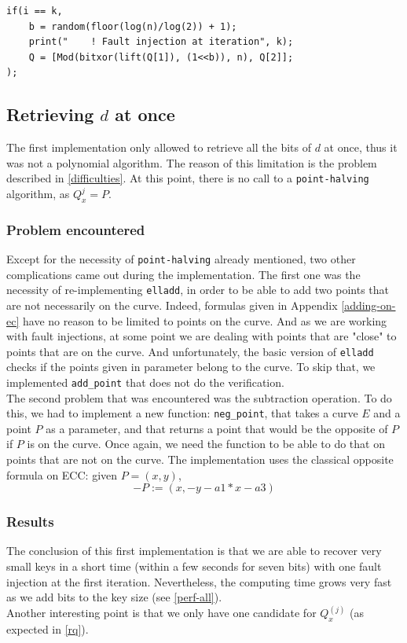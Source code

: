 \documentclass[journal]{IEEEtran}
\begin{document}
\begin{footnotesize}
\begin{verbatim}
if(i == k,
    b = random(floor(log(n)/log(2)) + 1);
    print("    ! Fault injection at iteration", k);
    Q = [Mod(bitxor(lift(Q[1]), (1<<b)), n), Q[2]];
);
\end{verbatim}
\end{footnotesize}

\subsection{Retrieving $d$ at once}
The first implementation only allowed to retrieve all the bits of $d$ at once, thus it was not a polynomial algorithm. The reason of this limitation is the problem described in \ref{difficulties}.
At this point, there is no call to a {\tt point-halving} algorithm, as $Q_x^{j} = P$.\\

\subsubsection{Problem encountered}
Except for the necessity of {\tt point-halving} already mentioned, two other complications came out during the implementation. The first one was the necessity of re-implementing {\tt elladd}, in 
order to be able to add two points that are not necessarily on the curve. Indeed, formulas given in Appendix \ref{adding-on-ec} have no reason to be limited to points on the curve. And as we are working with 
fault injections, at some point we are dealing with points that are "close" to points that are on the curve. And unfortunately, the basic version of {\tt elladd} checks if the points given in parameter belong to the curve.
To skip that, we implemented {\tt add\_point} that does not do the verification.\\ 

The second problem that was encountered was the subtraction operation. To do this, we had to implement a new function: {\tt neg\_point}, that takes a curve $E$ and a point $P$ as a parameter, and that returns a point that would be the
opposite of $P$ if $P$ is on the curve. Once again, we need the function to be able to do that on points that are not on the curve. The implementation uses the classical opposite formula on ECC: given $P = (x, y)$,
$$- P := (x, -y - a1*x - a3)$$

\subsubsection{Results}
The conclusion of this first implementation is that we are able to recover very small keys in a short time (within a few seconds for seven bits) with one fault injection at the first iteration.
Nevertheless, the computing time grows very fast as we add bits to the key size (see \ref{perf-all}).\\
Another interesting point is that we only have one candidate for $Q_x^{(j)}$ (as expected in \ref{rq}).
\end{document}
